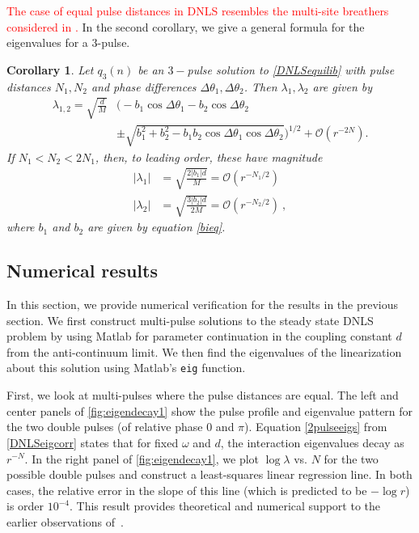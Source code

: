\documentclass[12pt]{elsarticle}
\newtheorem{corollary}{Corollary}
\newcommand{\revised}[1]{ \textcolor{red}{#1} }
\begin{document}
\revised{ The case of equal pulse distances in DNLS resembles the multi-site breathers considered in \cite[Lemma 2]{Pelinovsky2012}.} In the second corollary, we give a general formula for the eigenvalues for a 3-pulse.

\begin{corollary}\label{DNLSeigcorr2}
Let $q_3(n)$ be an $3-$pulse solution to \cref{DNLSequilib} with pulse distances $N_1, N_2$ and phase differences $\Delta \theta_1, \Delta \theta_2$. Then $\lambda_1, \lambda_2$ are given by
\begin{equation}\label{3pulseeigs}
\begin{aligned}
\lambda_{1,2} = \sqrt{\frac{d}{M}}
&\Big( -b_1\cos\Delta\theta_1 - b_2\cos\Delta\theta_2  \\
&\pm \sqrt{b_1^2 + b_2^2 - b_1 b_2\cos\Delta\theta_1 \cos\Delta\theta_2} \Big)^{1/2} + \mathcal{O}(r^{-2N}).
\end{aligned}
\end{equation}
If $N_1 < N_2 < 2 N_1$, then, to leading order, these have magnitude
\begin{equation}\label{3pulsemag}
\begin{aligned}
|\lambda_1| &= \sqrt{\frac{2 |b_1| d}{M}} = \mathcal{O}(r^{-N_1/2}) \\
|\lambda_2| &= \sqrt{\frac{3 |b_2| d}{2 M}} = \mathcal{O}(r^{-N_2/2}) \:,
\end{aligned}
\end{equation}
where $b_1$ and $b_2$ are given by equation \cref{bieq}.
\end{corollary}

\subsection{Numerical results}

In this section, we provide numerical verification for the results in the previous section. We first construct multi-pulse solutions to the steady state DNLS problem by using Matlab for parameter continuation in the coupling constant $d$ from the anti-continuum limit. We then find the eigenvalues of the linearization about this solution using Matlab's \texttt{eig} function. 

First, we look at multi-pulses where the pulse distances are equal.  The left and center panels of \cref{fig:eigendecay1} show the pulse profile and eigenvalue pattern for the two double pulses (of relative
phase $0$ and $\pi$). Equation \cref{2pulseeigs} from \cref{DNLSeigcorr} states that for fixed $\omega$ and $d$, the interaction eigenvalues decay as $r^{-N}$. In the right panel of \cref{fig:eigendecay1}, we plot $\log \lambda$ vs. $N$ for the two possible double pulses and construct a least-squares linear regression line. In both cases, the relative error in the slope of this line (which is predicted to be $-\log r$) is order $10^{-4}$. This result provides theoretical and numerical support to the earlier observations of~\cite{Kapitula2001a}.
\end{document}

